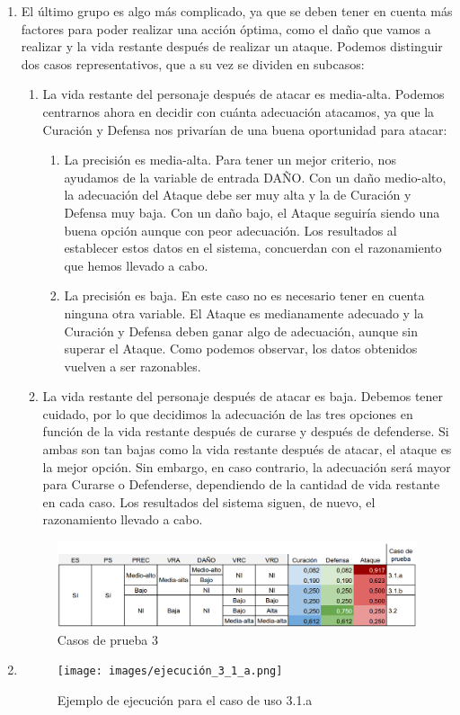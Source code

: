 \begin{enumerate}
\item El último grupo es algo más complicado, ya que se deben tener en cuenta más factores para poder realizar una acción óptima, como el daño que vamos a realizar y la vida restante después de realizar un ataque. Podemos distinguir dos casos representativos, que a su vez se dividen en subcasos:
\begin{enumerate}[label={3.\arabic*.}]
	\item La vida restante del personaje después de atacar es media-alta. Podemos centrarnos ahora en decidir con cuánta adecuación atacamos, ya que la Curación y Defensa nos privarían de una buena oportunidad para atacar:
	\begin{enumerate}[label=\alph*)]
		\item La precisión es media-alta. Para tener un mejor criterio, nos ayudamos de la variable de entrada DAÑO. Con un daño medio-alto, la adecuación del Ataque debe ser muy alta y la de Curación y Defensa muy baja. Con un daño bajo, el Ataque seguiría siendo una buena opción aunque con peor adecuación. Los resultados al establecer estos datos en el sistema, concuerdan con el razonamiento que hemos llevado a cabo.
		\item La precisión es baja. En este caso no es necesario tener en cuenta ninguna otra variable. El Ataque es medianamente adecuado y la Curación y Defensa deben ganar algo de adecuación, aunque sin superar el Ataque. Como podemos observar, los datos obtenidos vuelven a ser razonables.
	\end{enumerate}
	\item La vida restante del personaje después de atacar es baja. Debemos tener cuidado, por lo que decidimos la adecuación de las tres opciones en función de la vida restante después de curarse y después de defenderse. Si ambas son tan bajas como la vida restante después de atacar, el ataque es la mejor opción. Sin embargo, en caso contrario, la adecuación será mayor para Curarse o Defenderse, dependiendo de la cantidad de vida restante en cada caso. Los resultados del sistema siguen, de nuevo, el razonamiento llevado a cabo.
\end{enumerate}


\begin{figure}[H]
	\centering
	\includegraphics[width=\textwidth,height=\textheight,keepaspectratio]{images/casos_pruebas2.png}
	\caption{Casos de prueba 3}
	\label{fig:casos_prueba3}
\end{figure}

\item[] \begin{figure}[H]
	\centering
	\texttt{[image: images/ejecución\_3\_1\_a.png]}
	\caption{Ejemplo de ejecución para el caso de uso 3.1.a}
	\label{fig:casos_prueba1}
\end{figure}

\end{enumerate}